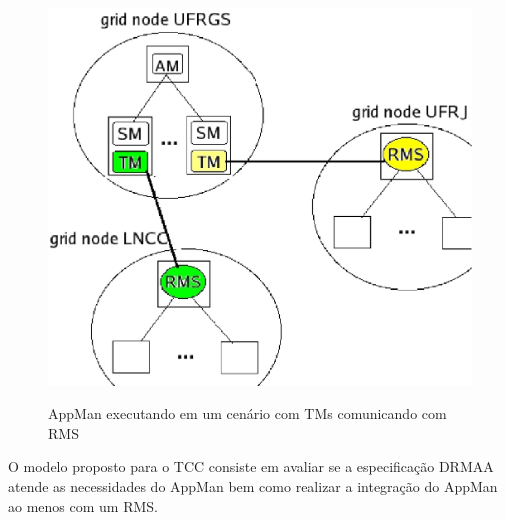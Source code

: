 \begin{figure}[hpts]
\center
\includegraphics[scale=.4]{img/AppManRMS.eps}
\label{AppManRMS}
\caption{AppMan executando em um cenário com TMs comunicando com RMS}
\end{figure}

O modelo proposto para o TCC consiste em avaliar se a especificação DRMAA atende as necessidades do AppMan bem como realizar a integração do AppMan ao menos com um RMS.
